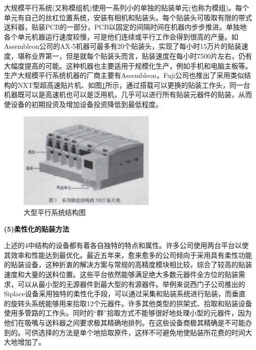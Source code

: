\documentclass[a4paper]{article}%
\begin{document}
\begin{CJK}{UTF8}{gbsn}
大规模平行系统(又称模组机)使用一系列小的单独的贴装单元(也称为模组)。每个单元有自己的丝杠位置系统，安装有相机和贴装头。每个贴装头可吸取有限的带式送料器，贴装PCB的一部分，PCB以固定的间隔时间在机器内步步推进。单独地各个单元机器运行速度较慢，可是他们连续或平行工作会得到很高的产量。如Assembleon公司的AX-5机器可最多有20个贴装头，实现了每小时15万片的贴装速度，堪称业界第一，但是就每个贴装头而言，贴装速度在每小时7500片左右，仍有大幅度提高的可能。这种机器也主要适用于规模化生产，例如手机和电脑主板等。生产大规模平行系统机器的厂商主要有Assembleon，Fuji公司也推出了采用类似结构的NXT型超高速贴片机、如图\ref{fig305}所示，通过搭载可以更换的贴装工作头，同一台机器既可以是高速机也可以是泛用机，几乎可以进行所有贴装元器件的贴装，从而使设备的初期投资及增加设备投资降低到最低程度。
\begin{figure}[htb!]
\centering
\includegraphics[width=0.6\textwidth]{fig305.eps}
\caption{大型平行系统结构图}
\label{fig305}
\end{figure}

\textbf{(5)柔性化的贴装方法}

上述的4中结构的设备都有着各自独特的特点和属性。许多公司使用两台平台以使其效率和性能达到最优化。最近五年来，愈来愈多的公司倾向于采用具有柔性功能的贴装设备，这种折衷的解决方案与常规的高精度模块相比较，综合了较高的贴装速度和大量的送料位置。这些平台依然能够满足绝大多数元器件全方位的贴装需求，可以从最小型的无源器件到最大型的有源器件。举例来说西门子公司推出的Siplace设备采用独特的柔性化手段，可以通过采集和贴装系统进行贴装，而垂直的旋转头系统能够用来拾取12个元器件。许多其他类型的拱架式、拾取和贴装设备使用多管路的工作头。同时的“群”拾取方式不能够很好地处理小型的元器件，因为他们在吸嘴与送料器之间要求极其精确地排列。在这些设备商极其精确是不可能办到的。可供选择的方法是单个地拾取原件，这样不可避免地使贴装所花费的时间大大地增加了。


\end{CJK}
\end{document}
